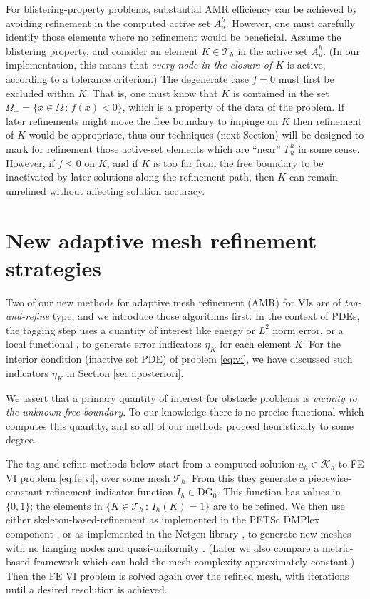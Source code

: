 \documentclass[]{interact}
\theoremstyle{plain}%
\theoremstyle{definition}
\theoremstyle{remark}
\newcommand{\cK}{\mathcal{K}}
\newcommand{\cT}{\mathcal{T}}
\newcommand{\DG}{\text{DG}}
\begin{document}
For blistering-property problems, substantial AMR efficiency can be achieved by avoiding refinement in the computed active set $A_u^h$.  However, one must carefully identify those elements where no refinement would be beneficial.  Assume the blistering property, and consider an element $K\in \cT_h$ in the active set $A_u^h$.  (In our implementation, this means that \emph{every node in the closure of $K$} is active, according to a tolerance criterion.)  The degenerate case $f=0$ must first be excluded within $K$.  That is, one must know that $K$ is contained in the set $\Omega_- = \{x\in \Omega\,:\,f(x) < 0\}$, which is a property of the data of the problem.  If later refinements might move the free boundary to impinge on $K$ then refinement of $K$ would be appropriate, thus our techniques (next Section) will be designed to mark for refinement those active-set elements which are ``near'' $\Gamma_u^h$ in some sense.  However, if $f \le 0$ on $K$, and if $K$ is too far from the free boundary to be inactivated by later solutions along the refinement path, then $K$ can remain unrefined without affecting solution accuracy.


\section{New adaptive mesh refinement strategies} \label{sec:viamr}

Two of our new methods for adaptive mesh refinement (AMR) for VIs are of \emph{tag-and-refine} type, and we introduce those algorithms first.  In the context of PDEs, the tagging step uses a quantity of interest like energy or $L^2$ norm error, or a local functional \cite{BangerthRannacher2003}, to generate error indicators $\eta_K$ for each element $K$.  For the interior condition (inactive set PDE) of problem \eqref{eq:vi}, we have discussed such indicators $\eta_K$ in Section \ref{sec:aposteriori}.

We assert that a primary quantity of interest for obstacle problems is \emph{vicinity to the unknown free boundary}.  To our knowledge there is no precise functional which computes this quantity, and so all of our methods proceed heuristically to some degree.

The tag-and-refine methods below start from a computed solution $u_h \in \cK_h$ to FE VI problem \eqref{eq:fe:vi}, over some mesh $\cT_h$.  From this they generate a piecewise-constant refinement indicator function $I_h \in \DG_0$.  This function has values in $\{0,1\}$; the elements in $\{K \in \cT_h\,:\,I_h(K)=1\}$ are to be refined.  We then use either skeleton-based-refinement \cite{PlazaCarey2000} as implemented in the PETSc DMPlex component \cite{petsc-user-ref}, or as implemented in the Netgen library \cite{Betteridgeetal2024}, to generate new meshes with no hanging nodes and quasi-uniformity \cite{BangerthRannacher2003}.  (Later we also compare a metric-based framework \cite{Wallworketal2020} which can hold the mesh complexity approximately constant.)  Then the FE VI problem is solved again over the refined mesh, with iterations until a desired resolution is achieved.
\end{document}
